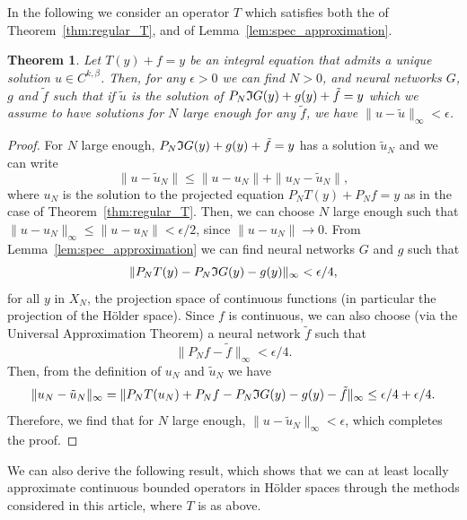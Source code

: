 \documentclass[11pt,fleqn]{amsart} %
\newtheorem{theorem}{Theorem}[section]
\begin{document}
	In the following we consider an operator $T$ which satisfies both the of Theorem~\ref{thm:regular_T}, and of Lemma~\ref{lem:spec_approximation}. 
	\begin{theorem}
		Let $T(y) + f = y$ be an integral equation that admits a unique solution $u\in C^{k,\beta}$. Then, for any $\epsilon>0$ we can find $N>0$, and neural networks $G$, $g$ and $\tilde f$ such that if $\tilde u$ is the solution of $P_N\frak I G(y) + g(y) + \tilde f = y$ which we assume to have solutions for $N$ large enough for any $\tilde f$, we have $\|u-\tilde u\|_\infty < \epsilon$.
	\end{theorem}
	\begin{proof}
		For $N$ large enough, $P_N\frak I G(y) + g(y) + \tilde f = y$ has a solution $\tilde u_N$ and we can write 
		$$
		\|u - \tilde u_N\| \leq \|u - u_N\| + \|u_N - \tilde u_N\|,
		$$
		where $u_N$ is the solution to the projected equation $P_NT(y) + P_Nf = y$ as in the case of Theorem~\ref{thm:regular_T}. Then, we can choose $N$ large enough such that $\|u - u_N\|_\infty \leq  \|u - u_N\| < \epsilon/2$, since $\|u-u_N\| \longrightarrow 0$. From Lemma~\ref{lem:spec_approximation} we can find neural networks $G$ and $g$ such that 
		$$
		\|P_NT(y) - P_N \frak I G(y) - g(y)\|_\infty < \epsilon/4,
		$$
		for all $y$ in $X_N$, the projection space of continuous functions (in particular the projection of the H\"{o}lder space). 	Since $f$ is continuous, we can also choose (via the Universal Approximation Theorem) a neural network $\tilde f$ such that
		$$
		\|P_Nf - \tilde f\|_\infty < \epsilon/4. 
		$$
		Then, from the definition of $u_N$ and $\tilde u_N$ we have 
		$$
		\|u_N - \tilde u_N\|_\infty = \|P_NT(u_N) + P_Nf - P_N \frak I G(y) - g(y) - \tilde f\|_\infty \leq \epsilon/4 + \epsilon/4.
		$$
		Therefore, we find that for $N$ large enough, $\|u - \tilde u_N\|_\infty < \epsilon$, which completes the proof. 
	\end{proof}
	
	
	We can also derive the following result, which shows that we can at least locally approximate continuous bounded operators in H\"{o}lder spaces through the methods considered in this article, where $T$ is as above. 
	
\end{document}
